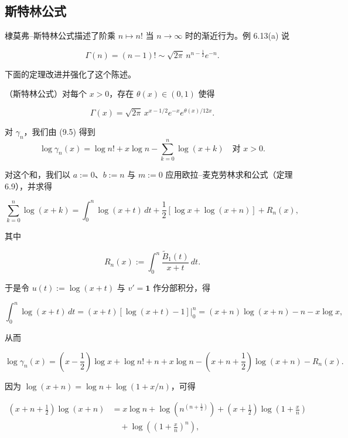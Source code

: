\subsection*{斯特林公式}

棣莫弗–斯特林公式描述了阶乘 $ n \mapsto n! $ 当 $ n \to \infty $ 时的渐近行为。例 6.13(a) 说

\begin{equation}
\Gamma(n) = (n-1)! \sim \sqrt{2\pi} \, n^{n-\frac{1}{2}} e^{-n} .\tag{9.22}
\end{equation}

下面的定理改进并强化了这个陈述。

\begin{theorem}

（斯特林公式）对每个 $ x > 0 $，存在 $ \theta(x) \in (0, 1) $ 使得

\[
\Gamma(x) = \sqrt{2\pi} \, x^{x-1/2} e^{-x} e^{\theta(x)/12x} .
\]

\proofhead
对 $ \gamma_n $，我们由 (9.5) 得到
\[
\log \gamma_n(x) = \log n! + x \log n - \sum_{k=0}^{n} \log(x+k) \quad \text{对 } x > 0 .
\]

对这个和，我们以 $ a := 0 $、$ b := n $ 与 $ m := 0 $ 应用欧拉–麦克劳林求和公式（定理 6.9），并求得

\[
\sum_{k=0}^{n} \log(x+k) = \int_{0}^{n} \log(x+t) \, dt + \frac{1}{2} \left[ \log x + \log(x+n) \right] + R_n(x) ,
\]

其中

\[
R_n(x) := \int_{0}^{n} \frac{\widetilde{B}_1(t)}{x+t} \, dt .
\]

于是令 $ u(t) := \log(x+t) $ 与 $ v' = \mathbf{1} $ 作分部积分，得

\[
\int_{0}^{n} \log(x+t) \, dt = (x+t)\left[ \log(x+t) - 1 \right] \big|_{0}^{n} = (x+n)\log(x+n) - n - x\log x ,
\]

从而

\[
\log \gamma_n(x) = \left( x - \frac{1}{2} \right) \log x + \log n! + n + x\log n - \left( x + n + \frac{1}{2} \right) \log(x+n) - R_n(x) .
\]

因为 $ \log(x+n) = \log n + \log(1 + x/n) $，可得

\begin{equation*}
\begin{aligned}
\left( x + n + \frac{1}{2} \right) \log(x+n) &= x \log n + \log\left( n^{(n+\frac{1}{2})} \right) + \left( x + \frac{1}{2} \right) \log\left( 1 + \frac{x}{n} \right) \\ &\quad + \log\left( \left( 1 + \frac{x}{n} \right)^{n} \right) ,
\end{aligned}
\end{equation*}


\end{theorem}
